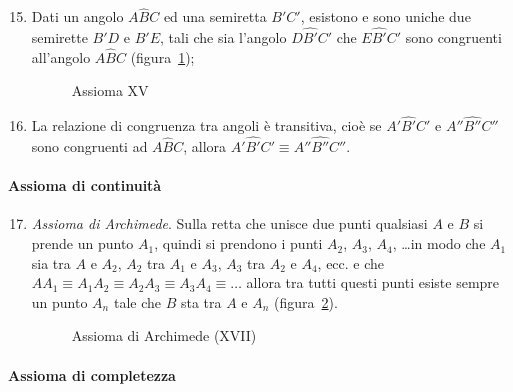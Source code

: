 \begin{enumerate}[label=\Roman{*}.]
\setcounter{enumi}{14}
\item Dati un angolo $A\widehat{B}C$ ed una semiretta $B'C'$, 
esistono e sono uniche due semirette $B'D$ e $B'E$, tali che sia 
l'angolo $D\widehat{B'}C'$ che $E\widehat{B'}C'$ sono congruenti 
all'angolo $A\widehat{B}C$ (figura~\ref{fig:1.10});

\begin{inaccessibleblock}
 \begin{figure}[bth]
 \centering 
 \caption{Assioma XV}\label{fig:1.10}
\end{figure}
\end{inaccessibleblock}
\item La relazione di congruenza tra angoli è transitiva, cioè se  
$A'\widehat{B'}C'$ e  $A''\widehat{B''}C''$ sono congruenti ad 
$A\widehat{B}C$, allora  $A'\widehat{B'}C' \equiv 
A''\widehat{B''}C''$.
\end{enumerate}

\paragraph{Assioma di continuità}

\begin{enumerate}[label=\Roman{*}.]
\setcounter{enumi}{16}
\item \emph{Assioma di Archimede}. Sulla retta che unisce due punti 
qualsiasi $A$ e $B$ si prende un punto $A_1$, quindi si prendono i 
punti $A_2$, $A_3$, $A_4$, \ldots in modo che $A_1$ sia tra $A$ e 
$A_2$, $A_2$ tra $A_1$ e $A_3$, $A_3$ tra $A_2$ e $A_4$, ecc. e che  
$AA_1\equiv A_1A_2\equiv A_2A_3\equiv A_3A_4\equiv\ldots$ allora tra 
tutti questi punti esiste sempre un punto $A_n$ tale che $B$ sta tra 
$A$ e $A_n$ (figura~\ref{fig:1.11}).

\begin{inaccessibleblock}
 \begin{figure}[bth]
 \centering 
 \caption{Assioma di Archimede (XVII)}\label{fig:1.11}
\end{figure}
\end{inaccessibleblock}
\end{enumerate}

\paragraph{Assioma di completezza}

